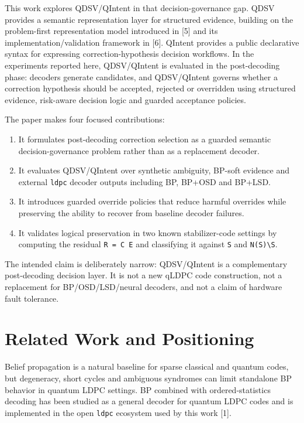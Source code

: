 \documentclass[11pt]{article}
\begin{document}
This work explores QDSV/QIntent in that decision-governance gap. QDSV provides a semantic representation layer for structured evidence, building on the problem-first representation model introduced in [5] and its implementation/validation framework in [6]. QIntent provides a public declarative syntax for expressing correction-hypothesis decision workflows. In the experiments reported here, QDSV/QIntent is evaluated in the post-decoding phase: decoders generate candidates, and QDSV/QIntent governs whether a correction hypothesis should be accepted, rejected or overridden using structured evidence, risk-aware decision logic and guarded acceptance policies.


The paper makes four focused contributions:


\begin{enumerate}[leftmargin=*]
\item It formulates post-decoding correction selection as a guarded semantic decision-governance problem rather than as a replacement decoder.
\item It evaluates QDSV/QIntent over synthetic ambiguity, BP-soft evidence and external \texttt{ldpc} decoder outputs including BP, BP+OSD and BP+LSD.
\item It introduces guarded override policies that reduce harmful overrides while preserving the ability to recover from baseline decoder failures.
\item It validates logical preservation in two known stabilizer-code settings by computing the residual \texttt{R = C E} and classifying it against \texttt{S} and \texttt{N(S)\textbackslash{}S}.
\end{enumerate}

The intended claim is deliberately narrow: QDSV/QIntent is a complementary post-decoding decision layer. It is not a new qLDPC code construction, not a replacement for BP/OSD/LSD/neural decoders, and not a claim of hardware fault tolerance.


\section{Related Work and Positioning}

Belief propagation is a natural baseline for sparse classical and quantum codes, but degeneracy, short cycles and ambiguous syndromes can limit standalone BP behavior in quantum LDPC settings. BP combined with ordered-statistics decoding has been studied as a general decoder for quantum LDPC codes and is implemented in the open \texttt{ldpc} ecosystem used by this work [1].
\end{document}
